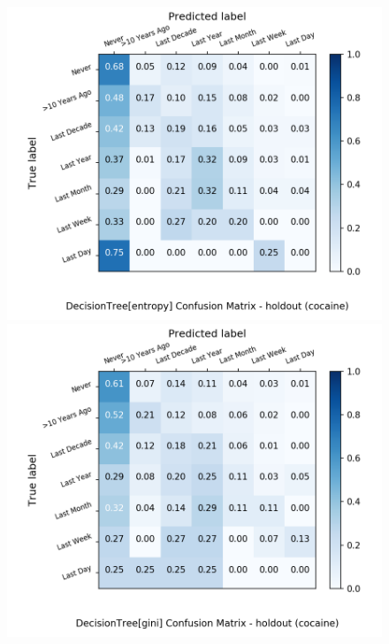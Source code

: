\begin{figure}[H]
	\centering
	\begin{minipage}[b]{0.32\textwidth}
		\includegraphics[width=1.1\textwidth]{Plots/cocaine_DecisionTree_entropy_balance_False_holdout.png}
	\end{minipage}
	\begin{minipage}[b]{0.32\textwidth}
		\includegraphics[width=1.1\textwidth]{Plots/cocaine_DecisionTree_gini_balance_False_holdout.png}
	\end{minipage}
	\begin{minipage}[b]{0.32\textwidth}

\end{minipage}
\end{figure}
